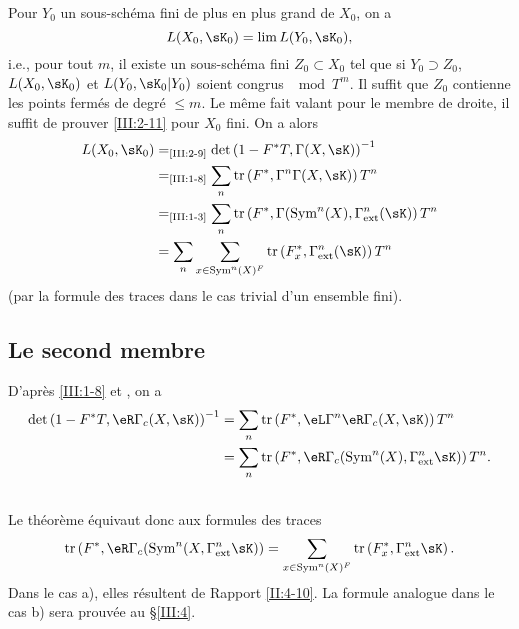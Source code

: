 Pour $Y_0$ un sous-schéma fini de plus en plus grand de $X_0$, on a 
\[
  L(X_0,\sK_0) = \lim L(Y_0,\sK_0) \text{,}
\]
i.e., pour tout $m$, il existe un sous-schéma fini $Z_0\subset X_0$ tel que 
si $Y_0\supset Z_0$, $L(X_0,\sK_0)$ et $L(Y_0,\sK_0|Y_0)$ soient congrus 
$\mod T^m$. 
Il suffit que $Z_0$ contienne les points fermés de degré $\leqslant m$. 
Le même fait valant pour le membre de droite, il suffit de prouver 
\ref{III:2-11} pour $X_0$ fini. On a alors 
\begin{align*}
  L(X_0,\sK_0) 
    &=_\text{\ref{III:2-9}} \det\left(1-F^* T,\Gamma(X,\sK)\right)^{-1} \\
    &=_\text{\ref{III:1-8}} \sum_n \tr\left(F^*,\Gamma^n \Gamma(X,\sK)\right) T^n \\
    &=_\text{\ref{III:1-3}} \sum_n \tr\left(F^*,\Gamma(\operatorname{Sym}^n(X),\Gamma_\text{ext}^n(\sK)\right) T^n \\
    &= \sum_n \sum_{x\in \operatorname{Sym}^n(X)^F} \tr\left(F_x^*,\Gamma_\text{ext}^n(\sK)\right) T^n
\end{align*}
(par la formule des traces dans le cas trivial d'un ensemble fini). 





\subsection{Le second membre}\label{III:2-12}

D'après \ref{III:1-8} et \cite[XVII 5.5.12]{sga4}, on a 
\begin{align*}
  \det\left(1-F^* T,\eR\Gamma_c(X,\sK)\right)^{-1} 
    &= \sum_n \tr\left(F^*,\eL\Gamma^n\eR\Gamma_c(X,\sK)\right) T^n \\
    &= \sum_n \tr\left(F^*,\eR\Gamma_c(\operatorname{Sym}^n(X),\Gamma_\text{ext}^n\sK)\right) T^n \text{.}
\end{align*}





\subsection{}\label{III:2-13}

Le théorème équivaut donc aux formules des traces 
\[
  \tr\left(F^*,\eR\Gamma_c(\operatorname{Sym}^n(X,\Gamma_\text{ext}^n \sK)\right) = \sum_{x\in\operatorname{Sym}^n(X)^F} \tr\left(F_x^*,\Gamma_\text{ext}^n\sK\right) \text{.}
\]
Dans le cas a), elles résultent de Rapport \ref{II:4-10}. La formule 
analogue dans le cas b) sera prouvée au \S\ref{III:4}. 










